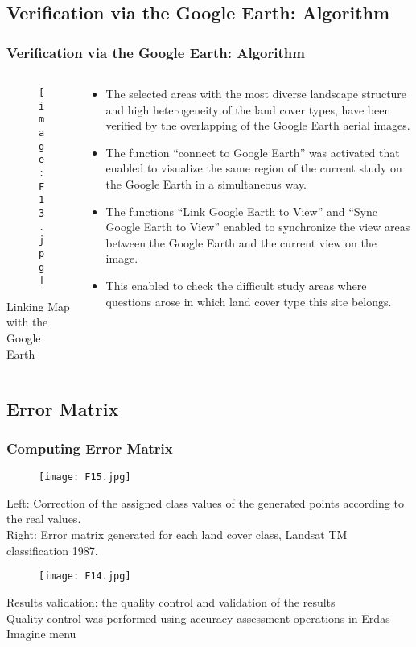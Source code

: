 \documentclass[pdflatex,compress,8pt,
	xcolor={dvipsnames,dvipsnames,svgnames,x11names,table},
	hyperref={
	breaklinks = true, 
	pdfauthor={Lemenkova Polina}, 
	pdfsubject={Preentation}, 
	pdfcreator={Lemenkova Polina}, 
	pdfproducer={Lemenkova Polina}, 
	citecolor=NavyBlue, 
	urlbordercolor=cyan,
	urlcolor = NavyBlue, 
	breaklinks = true}]{beamer}
\begin{document}
\subsection{Verification via the Google Earth: Algorithm}
\begin{frame}\frametitle{Verification via the Google Earth: Algorithm}
\begin{minipage}[0.4\textheight]{\textwidth}
\begin{columns}[T]
\begin{column}{0.5\textwidth}
\begin{figure}[H]
	\centering
		\texttt{[image: F13.jpg]}
\end{figure}
\small{Linking Map with the Google Earth}
\end{column}
\begin{column}{0.5\textwidth}
\begin{itemize}
	\item The selected areas with the most diverse landscape structure and high heterogeneity of the land cover types, have been verified by the overlapping of the Google Earth aerial images.
	\item The function “connect to Google Earth” was activated that enabled to visualize the same region of the current study on the Google Earth in a simultaneous way.
	\item The functions “Link Google Earth to View” and “Sync Google Earth to View” enabled to synchronize the view areas between the Google Earth and the current view on the image.
	\item This enabled to check the difficult study areas where questions arose in which land cover type this site belongs.
\end{itemize}
\end{column}
\end{columns}
\end{minipage}
\end{frame}

\subsection{Error Matrix}
\begin{frame}\frametitle{Computing Error Matrix}
\begin{figure}[H]
	\centering
		\texttt{[image: F15.jpg]}
\end{figure}
\small{Left: Correction of the assigned class values of the generated points according to the real values. \\
Right: Error matrix generated for each land cover class, Landsat TM classification 1987.}
\begin{figure}[H]
	\centering
		\texttt{[image: F14.jpg]}
\end{figure}
\small{Results validation: the quality control and validation of the results\\
 Quality control was performed using accuracy assessment operations in Erdas Imagine menu}
\end{frame}
\end{document}
